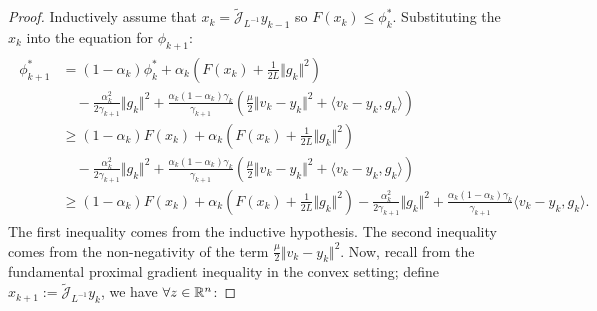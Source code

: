 \documentclass[12pt]{article}
\begin{document}
    \begin{proof}
        Inductively assume that $x_k = \widetilde{\mathcal J}_{L^{-1}}y_{k - 1}$ so $F(x_k) \le \phi_k^*$. 
        Substituting the $x_k$ into the equation for $\phi_{k + 1}$: 
        {\small
        \begin{align}
            \begin{split}
                \phi_{k + 1}^* &= 
                (1 - \alpha_k) \phi_k^*
                + 
                \alpha_k
                \left(
                    F(x_k) + \frac{1}{2L}\Vert g_k\Vert^2
                \right)
                \\&\quad 
                    - \frac{\alpha_k^2}{2\gamma_{k + 1}}\Vert g_k\Vert^2
                    + \frac{\alpha_k (1 - \alpha_k)\gamma_k}{\gamma_{k + 1}}
                    \left(
                        \frac{\mu}{2}\Vert v_k - y_k\Vert^2 + \langle v_k - y_k, g_k\rangle
                    \right)
                \\
                &\ge 
                (1 - \alpha_k)F(x_k)
                + 
                \alpha_k
                \left(
                    F(x_k) + \frac{1}{2L}\Vert g_k\Vert^2
                \right)
                \\&\quad
                    - \frac{\alpha_k^2}{2\gamma_{k + 1}}\Vert g_k\Vert^2
                    + \frac{\alpha_k (1 - \alpha_k)\gamma_k}{\gamma_{k + 1}}
                    \left(
                        \frac{\mu}{2}\Vert v_k - y_k\Vert^2 + \langle v_k - y_k, g_k\rangle
                    \right)
                \\
                &\ge 
                (1 - \alpha_k)F(x_k)
                + 
                \alpha_k
                \left(
                    F(x_k) + \frac{1}{2L}\Vert g_k\Vert^2
                \right)
                - \frac{\alpha_k^2}{2\gamma_{k + 1}}\Vert g_k\Vert^2
                + 
                \frac{\alpha_k (1 - \alpha_k)\gamma_k}{\gamma_{k + 1}}
                \langle v_k - y_k, g_k\rangle. 
            \end{split}
            \label{app:acc-prox-grad-ineq1}
        \end{align}
        }
        The first inequality comes from the inductive hypothesis. 
        The second inequality comes from the non-negativity of the term $\frac{\mu}{2}\Vert v_k - y_k\Vert^2$. 
        Now, recall from the fundamental proximal gradient inequality in the convex setting; define $x_{k + 1} := \widetilde{\mathcal J}_{L^{-1}}y_k$, we have $\forall z\in \mathbb R^n$: 

\end{proof}
\end{document}
